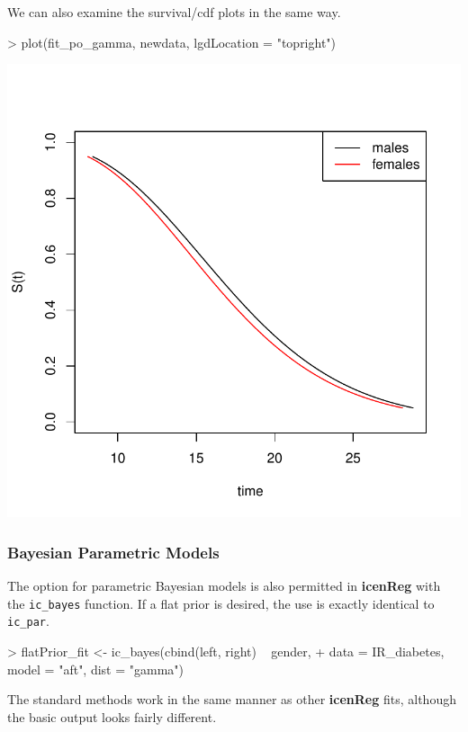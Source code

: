 \documentclass[a4paper]{article}
\begin{document}
  We can also examine the survival/cdf plots in the same way. 
  
\begin{Schunk}
\begin{Sinput}
> plot(fit_po_gamma, newdata, lgdLocation = "topright")
\end{Sinput}
\end{Schunk}
\includegraphics{icenReg-012}

  \subsubsection{Bayesian Parametric Models}
  
  The option for parametric Bayesian models is also permitted in {\bf icenReg} with the \texttt{ic\_bayes} function. If a flat prior is desired, the use is exactly identical to \texttt{ic\_par}. 
  
\begin{Schunk}
\begin{Sinput}
> flatPrior_fit <- ic_bayes(cbind(left, right) ~ gender,
+     data = IR_diabetes, model = "aft", dist = "gamma")
\end{Sinput}
\end{Schunk}

The standard methods work in the same manner as other {\bf icenReg} fits, although the basic output looks fairly different.
\end{document}
